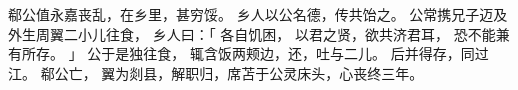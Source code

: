 
\switchcolumn*[\section{}]

郗公值永嘉丧乱，在乡里，甚穷馁。
乡人以公名德，传共饴之。
公常携兄子迈及外生周翼二小儿往食，
乡人曰：「
    各自饥困，
    以君之贤，欲共济君耳，
    恐不能兼有所存。
」
公于是独往食，
辄含饭两颊边，还，吐与二儿。
后并得存，同过江。
郗公亡，
翼为剡县，解职归，席苫于公灵床头，心丧终三年。

\switchcolumn



